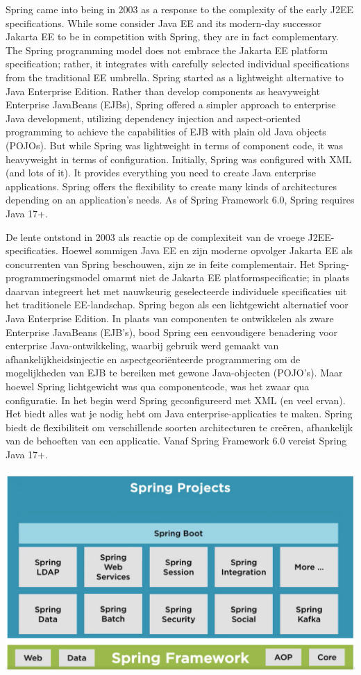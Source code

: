 Spring came into being in 2003 as a response to the complexity of the early J2EE specifications. While some consider Java EE and its modern-day successor Jakarta EE to be in competition with Spring, they are in fact complementary. The Spring programming model does not embrace the Jakarta EE platform specification; rather, it integrates with carefully selected individual specifications from the traditional EE umbrella. Spring started as a lightweight alternative to Java Enterprise Edition. Rather than develop components as heavyweight Enterprise
JavaBeans (EJBs), Spring offered a simpler approach to enterprise Java development, utilizing dependency injection and aspect-oriented programming to achieve the capabilities of EJB with plain old Java objects (POJOs).
But while Spring was lightweight in terms of component code, it was heavyweight in terms of configuration. Initially, Spring was configured with XML (and lots of it).
It provides everything you need to create Java enterprise applications. Spring offers the flexibility to create many kinds of architectures depending on an application’s needs. As of Spring Framework 6.0, Spring requires Java 17+.

De lente ontstond in 2003 als reactie op de complexiteit van de vroege J2EE-specificaties. Hoewel sommigen Java EE en zijn moderne opvolger Jakarta EE als concurrenten van Spring beschouwen, zijn ze in feite complementair. Het Spring-programmeringsmodel omarmt niet de Jakarta EE platformspecificatie; in plaats daarvan integreert het met nauwkeurig geselecteerde individuele specificaties uit het traditionele EE-landschap. Spring begon als een lichtgewicht alternatief voor Java Enterprise Edition. In plaats van componenten te ontwikkelen als zware Enterprise JavaBeans (EJB's), bood Spring een eenvoudigere benadering voor enterprise Java-ontwikkeling, waarbij gebruik werd gemaakt van afhankelijkheidsinjectie en aspectgeoriënteerde programmering om de mogelijkheden van EJB te bereiken met gewone Java-objecten (POJO's).
Maar hoewel Spring lichtgewicht was qua componentcode, was het zwaar qua configuratie. In het begin werd Spring geconfigureerd met XML (en veel ervan).
Het biedt alles wat je nodig hebt om Java enterprise-applicaties te maken. Spring biedt de flexibiliteit om verschillende soorten architecturen te creëren, afhankelijk van de behoeften van een applicatie. Vanaf Spring Framework 6.0 vereist Spring Java 17+.

\includegraphics[width=\textwidth]{./images/chapter1/spring_framework.png} 

